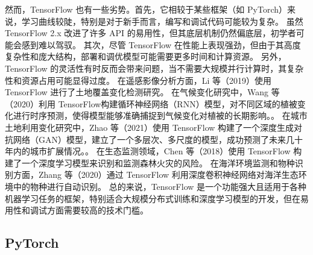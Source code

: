 \documentclass[AutoFakeBold]{LZUThesis-PgD&PhD}
\begin{document}
	然而，TensorFlow 也有一些劣势。首先，它相较于某些框架（如 PyTorch）来说，学习曲线较陡，特别是对于新手而言，编写和调试代码可能较为复杂。
	虽然 TensorFlow 2.x 改进了许多 API 的易用性，但其底层机制仍然偏底层，初学者可能会感到难以驾驭。
	其次，尽管 TensorFlow 在性能上表现强劲，但由于其高度复杂性和庞大结构，部署和调优模型可能需要更多时间和计算资源。
	另外，TensorFlow 的灵活性有时反而会带来问题，当不需要大规模并行计算时，其复杂性和资源占用可能显得过度。
	在遥感影像分析方面，Li 等（2019）使用 TensorFlow 进行了土地覆盖变化检测研究\cite{li2019}。
	在气候变化研究中，Wang 等（2020）利用 TensorFlow构建循环神经网络（RNN）模型，对不同区域的植被变化进行时序预测，使得模型能够准确捕捉到气候变化对植被的长期影响。\cite{wang2020H}。
	在城市土地利用变化研究中，Zhao 等（2021）使用 TensorFlow 构建了一个深度生成对抗网络（GAN）模型，建立了一个多层次、多尺度的模型，成功预测了未来几十年内的城市扩展情况。\cite{zhao2021}。
	在生态监测领域，Chen 等（2018）使用 TensorFlow 构建了一个深度学习模型来识别和监测森林火灾的风险\cite{chen2018}。
	在海洋环境监测和物种识别方面，Zhang 等（2020）通过 TensorFlow 利用深度卷积神经网络对海洋生态环境中的物种进行自动识别\cite{zhang2020}。
	总的来说，TensorFlow 是一个功能强大且适用于各种机器学习任务的框架，特别适合大规模分布式训练和深度学习模型的开发，但在易用性和调试方面需要较高的技术门槛。

	\subsection{PyTorch}
	
\end{document}
